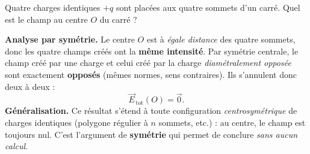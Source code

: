 \documentclass[11pt,a4paper]{article}
\newcommand{\vc}[1]{\vec{#1}}
\begin{document}
\begin{exemple}
Quatre charges identiques $+q$ sont placées aux quatre sommets d'un carré. Quel est le champ au
centre $O$ du carré ?

\smallskip
\begin{center}
\end{center}

\textbf{Analyse par symétrie.} Le centre $O$ est à \emph{égale distance} des quatre sommets, donc
les quatre champs créés ont la \textbf{même intensité}. Par symétrie centrale, le champ créé par
une charge et celui créé par la charge \emph{diamétralement opposée} sont exactement
\textbf{opposés} (mêmes normes, sens contraires). Ils s'annulent donc deux à deux :
\[ \vc{E}_{\,\text{tot}}(O) = \vc{0}. \]
\textbf{Généralisation.} Ce résultat s'étend à toute configuration \emph{centrosymétrique} de
charges identiques (polygone régulier à $n$ sommets, etc.) : au centre, le champ est toujours
nul. C'est l'argument de \textbf{symétrie} qui permet de conclure \emph{sans aucun calcul}.
\end{exemple}
\end{document}
